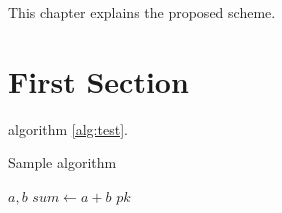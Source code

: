 This chapter explains the proposed scheme.

\section{First Section}
algorithm \ref{alg:test}.

\begin{algorithm}
	\caption{Sample algorithm}\label{alg:test}
	\begin{algorithmic}[1]	
		\Require  $a, b$ 
		\State $sum \gets a + b$
		\State \Return $pk$
		\EndProcedure
	\end{algorithmic}
\end{algorithm}
